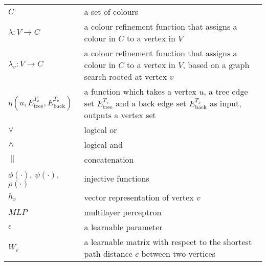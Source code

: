 \begin{table}[h!]
\begin{center}
\begin{small}
\begin{tabular}{ll}
$C$ &  a set of colours\\
$\lambda: V \rightarrow C$ & a colour refinement function that assigns a colour in $C$ to a vertex in $V$\\
$\lambda_v: V \rightarrow C$ & a colour refinement function that assigns a colour in $C$ to a vertex in $V$, based on a graph search rooted at vertex $v$\\
$\eta(u, E_{\text{tree}}^{T_v}, E_{\text{back}}^{T_v})$ & a function which takes a vertex $u$, a tree edge set $E_{\text{tree}}^{T_v}$ and a back edge set $E_{\text{back}}^{T_v}$ as input, outputs a vertex set \\
$\vee$ & logical or \\
$\wedge$ & logical and \\
$\parallel$ & concatenation \\
$\phi(\cdot)$, $\psi(\cdot)$, $\rho(\cdot)$ &  injective functions \\
$h_v$ &  vector representation of vertex $v$\\
$MLP$ &  multilayer perceptron\\
$\epsilon$ &  a learnable parameter \\
$W_{c}$ &  a learnable matrix with respect to the shortest path distance $c$ between two vertices \\
\bottomrule
\end{tabular}
\end{small}
\end{center}
\vskip -0.1in
\end{table}